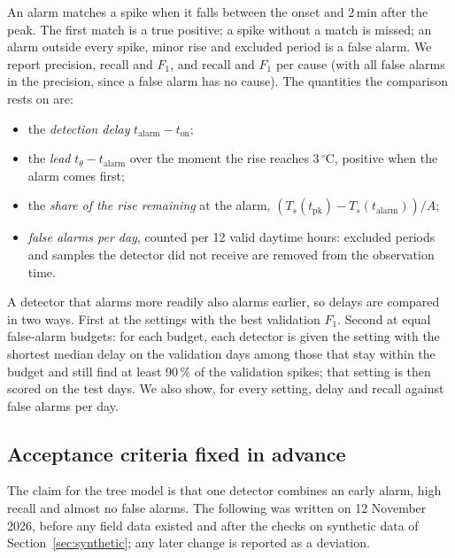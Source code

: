 \documentclass[conference]{IEEEtran}
\newcommand{\degC}{\ensuremath{^\circ}C}
\begin{document}
An alarm matches a spike when it falls between the onset and 2\,min after the peak. The
first match is a true positive; a spike without a match is missed; an alarm outside
every spike, minor rise and excluded period is a false alarm. We report precision,
recall and $F_1$, and recall and $F_1$ per cause (with all false alarms in the
precision, since a false alarm has no cause). The quantities the comparison rests on
are:
\begin{itemize}
\item the \emph{detection delay} $t_\mathrm{alarm}-t_\mathrm{on}$;
\item the \emph{lead} $t_\theta-t_\mathrm{alarm}$ over the moment the rise reaches
3\,\degC, positive when the alarm comes first;
\item the \emph{share of the rise remaining} at the alarm,
$(T_s(t_\mathrm{pk})-T_s(t_\mathrm{alarm}))/A$;
\item \emph{false alarms per day}, counted per 12 valid daytime hours: excluded periods
and samples the detector did not receive are removed from the observation time.
\end{itemize}
A detector that alarms more readily also alarms earlier, so delays are compared in two
ways. First at the settings with the best validation $F_1$. Second at equal
false-alarm budgets: for each budget, each detector is given the setting with the
shortest median delay on the validation days among those that stay within the budget
and still find at least 90\,\% of the validation spikes; that setting is then scored
on the test days. We also show, for every setting, delay and recall against false alarms
per day.

\subsection{Acceptance criteria fixed in advance}\label{sec:prereg}
The claim for the tree model is that one detector combines an early alarm, high recall
and almost no false alarms. The following was written on 12 November 2026, before any
field data existed and after the checks on synthetic data of
Section~\ref{sec:synthetic}; any later change is reported as a deviation.
\end{document}
